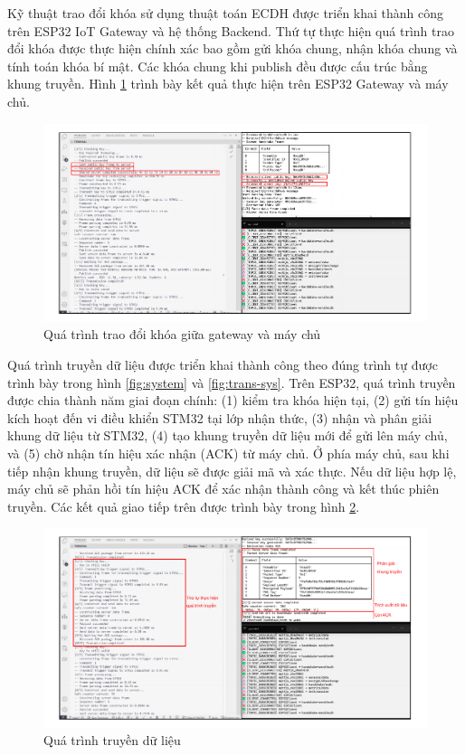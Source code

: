 Kỹ thuật trao đổi khóa sử dụng thuật toán ECDH được triển khai thành công trên ESP32 IoT Gateway và hệ thống Backend. Thứ tự thực hiện quá trình trao đổi khóa được thực hiện chính xác bao gồm gửi khóa chung, nhận khóa chung và tính toán khóa bí mật. Các khóa chung khi publish đều được cấu trúc bằng khung truyền. Hình \ref{fig:logecdh} trình bày kết quả thực hiện trên ESP32 Gateway và máy chủ.

\begin{figure}[h]
    \centering
    \hspace*{-0.7cm}
    \includegraphics[width=1.08\linewidth]{ecdhlog.pdf}
    \caption{Quá trình trao đổi khóa giữa gateway và máy chủ}
    \label{fig:logecdh}
\end{figure}

Quá trình truyền dữ liệu được triển khai thành công theo đúng trình tự được trình bày trong hình \ref{fig:system} và \ref{fig:trans-sys}. Trên ESP32, quá trình truyền được chia thành năm giai đoạn chính: (1) kiểm tra khóa hiện tại, (2) gửi tín hiệu kích hoạt đến vi điều khiển STM32 tại lớp nhận thức, (3) nhận và phân giải khung dữ liệu từ STM32, (4) tạo khung truyền dữ liệu mới để gửi lên máy chủ, và (5) chờ nhận tín hiệu xác nhận (ACK) từ máy chủ. 
Ở phía máy chủ, sau khi tiếp nhận khung truyền, dữ liệu sẽ được giải mã và xác thực. Nếu dữ liệu hợp lệ, máy chủ sẽ phản hồi tín hiệu ACK để xác nhận thành công và kết thúc phiên truyền. Các kết quả giao tiếp trên được trình bày trong hình \ref{fig:datalog}.
\begin{figure}[h]
    \centering
    \hspace*{-0.7cm}
    \includegraphics[width=1.08\linewidth]{datalog.pdf}
    \caption{Quá trình truyền dữ liệu}
    \label{fig:datalog}
\end{figure}

